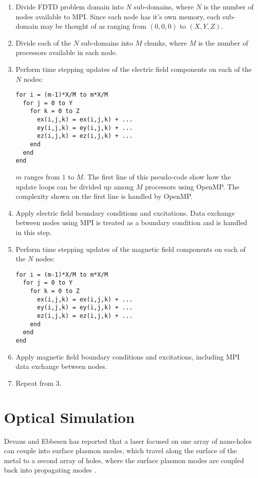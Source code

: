 \documentclass{acesconference}
\begin{document}
\begin{enumerate}
\item Divide FDTD problem domain into $N$ sub-domains, where $N$ is
  the number of nodes available to MPI. Since each node has it's own
  memory, each sub-domain may be thought of as ranging from $(0,0,0)$
  to $(X,Y,Z)$.
\item Divide each of the $N$ sub-domains into $M$ chunks, where $M$ is
  the number of processors available in each node.
\item Perform time stepping updates of the electric field components on each of
  the $N$ nodes:
\begin{verbatim}
for i = (m-1)*X/M to m*X/M
  for j = 0 to Y
    for k = 0 to Z
      ex(i,j,k) = ex(i,j,k) + ...
      ey(i,j,k) = ey(i,j,k) + ...
      ez(i,j,k) = ez(i,j,k) + ...
    end
  end
end
\end{verbatim}
  $m$ ranges from $1$ to $M$. The first line of this pseudo-code show
  how the update loops can be divided up among $M$ processors using
  OpenMP. The complexity shown on the first line is handled by
  OpenMP. 
\item Apply electric field boundary conditions and excitations. Data
  exchange between nodes using MPI is treated as a boundary condition
  and is handled in this step.
\item Perform time stepping updates of the magnetic field components
  on each of the $N$ nodes:
\begin{verbatim}
for i = (m-1)*X/M to m*X/M
  for j = 0 to Y
    for k = 0 to Z
      ex(i,j,k) = ex(i,j,k) + ...
      ey(i,j,k) = ey(i,j,k) + ...
      ez(i,j,k) = ez(i,j,k) + ...
    end
  end
end
\end{verbatim}
\item Apply magnetic field boundary conditions and excitations,
  including MPI data exchange between nodes. 
\item Repeat from 3.
\end{enumerate}


\section{Optical Simulation}
Devaus and Ebbesen has reported that a laser focused on one array of
nano-holes can couple into surface plasmon modes, which travel along
the surface of the metal to a second array of holes, where the surface
plasmon modes are coupled back into propagating modes
\cite{devaux2003}.
\end{document}
